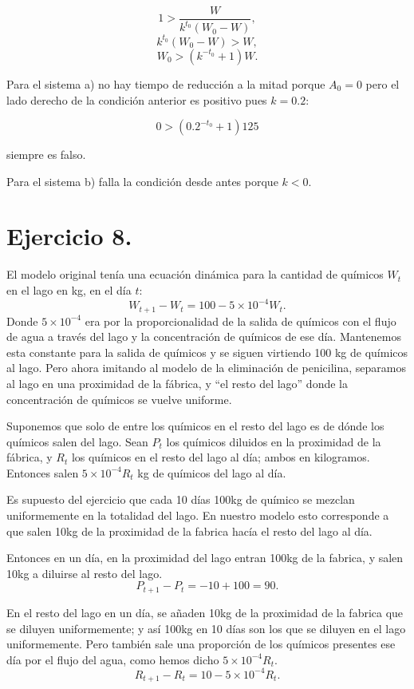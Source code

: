 \documentclass[11pt]{article}
\begin{document}
\[1> \frac{W}{k^{t_0}(W_0-W)},\] \[k^{t_0}(W_0-W)> W,\]
\[W_0> \left(k^{-t_0}+1\right)W.\]

    Para el sistema a) no hay tiempo de reducción a la mitad porque
\(A_0=0\) pero el lado derecho de la condición anterior es positivo pues
\(k=0.2\):

\[0> \left(0.2^{-t_0}+1\right)125\]

siempre es falso.

Para el sistema b) falla la condición desde antes porque \(k<0\).

    \hypertarget{ejercicio-8.}{%
\section*{Ejercicio 8.}\label{ejercicio-8.}}

El modelo original tenía una ecuación dinámica para la cantidad de
químicos \(W_t\) en el lago en kg, en el día \(t\):
\[W_{t+1}-W_t = 100-5\times 10^{-4} W_t.\] Donde \(5\times 10^{-4}\) era
por la proporcionalidad de la salida de químicos con el flujo de agua a
través del lago y la concentración de químicos de ese día. Mantenemos
esta constante para la salida de químicos y se siguen virtiendo 100 kg
de químicos al lago. Pero ahora imitando al modelo de la eliminación de
penicilina, separamos al lago en una proximidad de la fábrica, y ``el
resto del lago'' donde la concentración de químicos se vuelve uniforme.

Suponemos que solo de entre los químicos en el resto del lago es de
dónde los químicos salen del lago. Sean \(P_t\) los químicos diluidos en
la proximidad de la fábrica, y \(R_t\) los químicos en el resto del lago
al día; ambos en kilogramos. Entonces salen \(5\times 10^{-4} R_t\) kg
de químicos del lago al día.

Es supuesto del ejercicio que cada 10 días 100kg de químico se mezclan
uniformemente en la totalidad del lago. En nuestro modelo esto
corresponde a que salen 10kg de la proximidad de la fabrica hacía el
resto del lago al día.

Entonces en un día, en la proximidad del lago entran 100kg de la
fabrica, y salen 10kg a diluirse al resto del lago.
\[P_{t+1}-P_t = -10+100 = 90.\]

En el resto del lago en un día, se añaden 10kg de la proximidad de la
fabrica que se diluyen uniformemente; y así 100kg en 10 días son los que
se diluyen en el lago uniformemente. Pero también sale una proporción de
los químicos presentes ese día por el flujo del agua, como hemos dicho
\(5\times 10^{-4} R_t\). \[R_{t+1}-R_t = 10-5\times 10^{-4} R_t.\]
\end{document}
